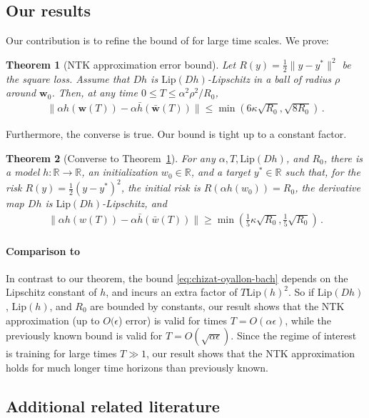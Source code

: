 \documentclass[11pt]{article} %
\newcommand{\R}{\mathbb{R}}
\newcommand{\<}{\langle}
\renewcommand{\>}{\rangle}
\def\bw{{\boldsymbol w}}
\def\barh{\bar{h}}
\def\barw{\bar{w}}
\def\barw{\bar{w}}
\newcommand{\Lip}{\mathrm{Lip}}
\theoremstyle{plain}
\newtheorem{theorem}{Theorem}[section]
\theoremstyle{definition}
\theoremstyle{remark}
\begin{document}
\subsection{Our results}
Our contribution is to refine the bound of \cite{chizat2019lazy} for large time scales. We prove:
\begin{theorem}[NTK approximation error bound]\label{thm:ntk-train-error}
Let $R(y) = \frac{1}{2} \|y - y^*\|^2$ be the square loss. Assume that $Dh$ is $\Lip(Dh)$-Lipschitz in a ball of radius $\rho$ around $\bw_0$. Then, at any time $0 \leq T \leq \alpha^2 \rho^2 / R_0$,
\begin{align}\label{eq:main-ntk-bound}\|\alpha h(\bw(T)) - \alpha \bar h(\bar \bw(T))\| \leq \min(6 \kappa \sqrt{R_0} , \sqrt{8R_0})\,.\end{align}
\end{theorem}
Furthermore, the converse is true. Our bound is tight up to a constant factor.

\begin{theorem}[Converse to Theorem~\ref{thm:ntk-train-error}]\label{thm:tight-converse}
For any $\alpha, T, \Lip(Dh)$, and $R_0$, there is a model $h : \R \to \R$, an initialization $w_0 \in \R$, and 
a target $y^* \in \R$ such that, for the risk $R(y) = \frac{1}{2}(y-y^*)^2$, the initial risk is $R(\alpha h(w_0)) = R_0$, the derivative map $Dh$ is $\Lip(Dh)$-Lipschitz, and
\begin{align*}
\|\alpha h(w(T)) - \alpha \barh(\barw(T))\| \geq \min(\frac{1}{5}\kappa \sqrt{R_0}, \frac{1}{5} \sqrt{R_0})\,.
\end{align*}
\end{theorem}


\paragraph{Comparison to \cite{chizat2019lazy}}
In contrast to our theorem, the bound \eqref{eq:chizat-oyallon-bach} depends on the Lipschitz constant of $h$, and incurs an extra factor of $T \Lip(h)^2$. So if $\Lip(Dh)$, $\Lip(h)$, and $R_0$ are bounded by constants, our result shows that the NTK approximation (up to $O(\epsilon$) error) is valid for times $T = O(\alpha \epsilon)$, while the previously known bound is valid for $T = O(\sqrt{\alpha \epsilon})$. Since the regime of interest is training for large times $T \gg 1$, our result shows that the NTK approximation holds for much longer time horizons than previously known.


\subsection{Additional related literature}\label{ssec:lit-rev}
\end{document}
